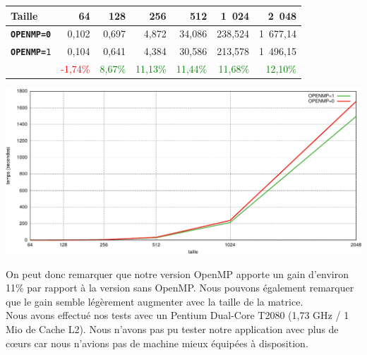 \documentclass[a4paper, 12pt]{article}
\begin{document}
\begin{center}
\begin{tabular}{|l|r|r|r|r|r|r|}
\hline
\textbf{Taille } & \textbf{64} & \textbf{128} & \textbf{256} & \textbf{512} & \textbf{1~024} & \textbf{2~048} \\ \hline
\texttt{\textbf{OPENMP=0}} & 0,102 & 0,697 & 4,872 & 34,086 & 238,524 & 1~677,14 \\ \hline
\texttt{\textbf{OPENMP=}1} & 0,104 & 0,641 & 4,384 & 30,586 & 213,578 & 1~496,15 \\ \hline
& \textcolor{red}{-1,74\%} & \textcolor{green}{8,67\%} & \textcolor{green}{11,13\%} & \textcolor{green}{11,44\%} & \textcolor{green}{11,68\%} & \textcolor{green}{12,10\%} \\ \hline
\end{tabular}
\end{center}

\begin{center}
\includegraphics[width=\textwidth]{includes/pdf/benchmark.pdf}
\end{center}

On peut donc remarquer que notre version OpenMP apporte un gain
d'environ 11\% par rapport à la version sans OpenMP. Nous pouvons
également remarquer que le gain semble légèrement augmenter avec la
taille de la matrice. \\

Nous avons effectué nos tests avec un Pentium Dual-Core T2080 (1,73
GHz / 1 Mio de Cache L2). Nous n'avons pas pu tester notre application
avec plus de cœurs car nous n'avions pas de machine mieux équipées à
disposition.
\end{document}
